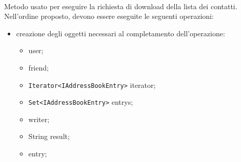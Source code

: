 \begin{description}
	\item{}\\	
	Metodo usato per eseguire la richiesta di download della lista dei contatti. Nell'ordine proposto, devono essere eseguite le seguenti operazioni:
	\begin{itemize}
		\item creazione degli oggetti necessari al completamento dell'operazione:
		\begin{itemize}
			\item {} user;
			\item {} friend;
			\item \texttt{Iterator<IAddressBookEntry>} iterator;
			\item \texttt{Set<IAddressBookEntry>} entrys;
			\item {} writer;
			\item String result;
			\item {} entry;
		\end{itemize}
		

\end{itemize}
\end{description}
